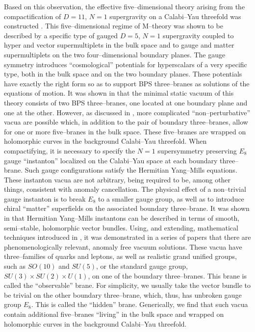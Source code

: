 \documentclass[a4paper,12pt]{article}
\numberwithin{equation}{section}
\theoremstyle{plain}
\begin{document}
Based on this observation, the effective five--dimensional theory arising from
the compactification of $D=11$, $N=1$ supergravity on a Calabi--Yau threefold
was constructed \cite{losw1, losw2}. 
This five--dimensional regime of M--theory was shown to be
described by a specific type of gauged $D=5$, $N=1$ supergravity
coupled to hyper and vector supermultiplets in the bulk space and
to gauge and matter supermultiplets on the two four--dimensional boundary planes. 
The gauge symmetry introduces ``cosmological'' potentials for 
hyperscalars of a very specific type, both in
the bulk space and on the two boundary planes. These potentials have exactly
the right form so as to support BPS three--branes as solutions of the
equations of motion. It was shown in \cite{losw1} that the minimal 
static vacuum of this
theory consists of two BPS three--branes, one located 
at one boundary plane
and one at the other. However, as discussed in \cite{nse}, 
more complicated
``non--perturbative'' vacua are possible which, in addition to the 
pair of
boundary three--branes, allow for one or more five--branes in the bulk space.
These five--branes are wrapped on holomorphic curves in the background
Calabi--Yau threefold. When compactifying, it is necessary to 
specify the $N=1$ supersymmetry preserving $E_{8}$ 
gauge ``instanton'' localized on the Calabi--Yau 
space at each boundary three--brane. Such gauge configurations satisfy the
Hermitian Yang--Mills equations. These instanton vacua are not
arbitrary, being required to be, among other things, consistent with
anomaly cancellation. The physical effect of a non--trivial gauge instanton is 
to break $E_{8}$ to a smaller gauge group, as well as to introduce 
chiral ``matter'' superfields on the associated boundary three--brane. 
It was shown in \cite{Don, UhYau} that Hermitian Yang--Mills instantons can be described in
terms of smooth, semi--stable, holomorphic vector bundles. Using, and extending, 
mathematical techniques introduced in \cite{FMW, FMW2, D, BJPS}, 
it was demonstrated 
in a series of papers \cite{don1, don2, don3} that 
there are phenomenologically relevant, 
anomaly free vacuum solutions. These vacua have 
three--families of quarks and leptons, as well as realistic 
grand unified groups, such as $SO(10)$ and $SU(5)$, 
or the standard gauge group, $SU(3) \times SU(2) \times U(1)$, 
on one of the boundary
three--branes. This brane is  called the ``observable'' brane. 
For simplicity,
we usually take the vector bundle to be trivial on the other boundary
three--brane, which, thus, has unbroken gauge group $E_{8}$. This is called the
``hidden'' brane. Generically, we find that such vacua contain additional 
five--branes  ``living'' in the bulk space and wrapped on holomorphic curves
in the background Calabi--Yau threefold.
\end{document}
